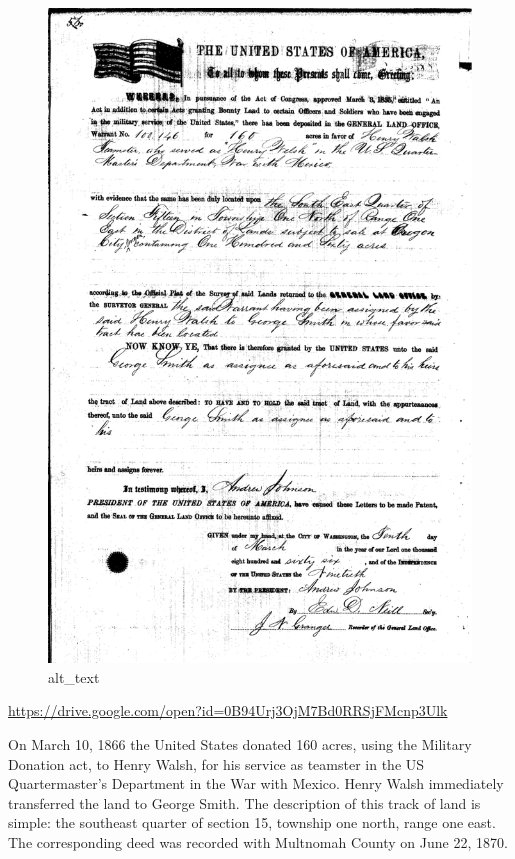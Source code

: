 \documentclass[
  12pt,
]{book}
\begin{document}
\begin{figure}
\centering
\includegraphics{images/0203a_images/image2.png}
\caption{alt\_text}
\end{figure}

\url{https://drive.google.com/open?id=0B94Urj3OjM7Bd0RRSjFMcnp3Ulk}

On March 10, 1866 the United States donated 160 acres, using the Military Donation act, to Henry Walsh, for his service as teamster in the US Quartermaster's Department in the War with Mexico. Henry Walsh immediately transferred the land to George Smith. The description of this track of land is simple: the southeast quarter of section 15, township one north, range one east. The corresponding deed was recorded with Multnomah County on June 22, 1870.
\end{document}
